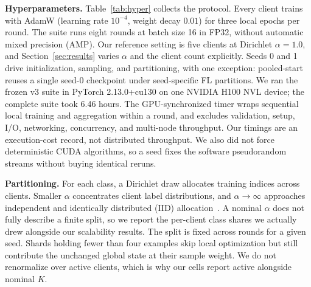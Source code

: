 \documentclass[letterpaper, conference]{IEEEtran}
\begin{document}
\textbf{Hyperparameters.}
Table~\ref{tab:hyper} collects the protocol. Every client trains with AdamW
(learning rate $10^{-4}$, weight decay $0.01$) for three local epochs per round.
The suite runs eight rounds at batch size 16 in FP32, without automatic mixed
precision (AMP). Our reference setting is five clients at Dirichlet $\alpha=1.0$,
and Section~\ref{sec:results} varies $\alpha$ and the client count explicitly. Seeds
0 and 1 drive initialization, sampling, and partitioning, with one exception:
pooled-start reuses a single seed-0 checkpoint under seed-specific FL partitions. We
ran the frozen v3 suite in PyTorch 2.13.0+cu130 on one NVIDIA H100 NVL device;
the complete suite took 6.46 hours. The GPU-synchronized timer
wraps sequential local training and
aggregation within a round, and excludes validation, setup, I/O, networking,
concurrency, and multi-node throughput. Our timings are an execution-cost record,
not distributed throughput. We also did not force deterministic CUDA algorithms, so
a seed fixes the software pseudorandom streams without buying identical reruns.

\textbf{Partitioning.}
For each class, a Dirichlet draw allocates training indices across clients. Smaller
$\alpha$ concentrates client label distributions, and $\alpha\!\to\!\infty$
approaches independent and identically distributed (IID)
allocation~. A nominal $\alpha$ does not fully describe a finite split,
so we report the per-client class shares we actually drew alongside our scalability
results. The split is fixed across rounds for a given seed. Shards
holding fewer than four examples skip local optimization but still contribute the
unchanged global state at their sample weight. We do not renormalize over active
clients, which is why our cells report active alongside nominal $K$.
\end{document}
